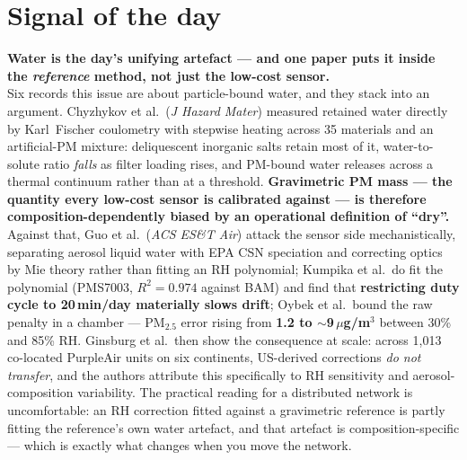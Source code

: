 \documentclass[10pt]{article}
\begin{document}
\vspace{6mm}

\section*{\sffamily\bfseries\color{Deep}Signal of the day}
\vspace{-1.5mm}{\color{Amber}\rule{\linewidth}{1.1pt}}\vspace{2.5mm}

\begin{keybox}
{\sffamily\bfseries\small\color{Deep}Water is the day's unifying artefact --- and one paper
puts it inside the \emph{reference} method, not just the low-cost sensor.}\\[1.4mm]
\footnotesize
Six records this issue are about particle-bound water, and they stack into an argument.
Chyzhykov et al.\ (\textit{J Hazard Mater}) measured retained water directly by
Karl~Fischer coulometry with stepwise heating across 35 materials and an artificial-PM
mixture: deliquescent inorganic salts retain most of it, water-to-solute ratio
\emph{falls} as filter loading rises, and PM-bound water releases across a thermal
continuum rather than at a threshold. \textbf{Gravimetric PM mass --- the quantity every
low-cost sensor is calibrated against --- is therefore composition-dependently biased by
an operational definition of ``dry''.} Against that, Guo et al.\ (\textit{ACS ES\&T Air})
attack the sensor side mechanistically, separating aerosol liquid water with EPA CSN
speciation and correcting optics by Mie theory rather than fitting an RH polynomial;
Kumpika et al.\ do fit the polynomial (PMS7003, $R^2 = 0.974$ against BAM) and find that
\textbf{restricting duty cycle to 20\,min/day materially slows drift}; Oybek et al.\
bound the raw penalty in a chamber --- PM$_{2.5}$ error rising from
\textbf{1.2 to $\sim$9\,$\mu$g/m$^3$} between 30\% and 85\% RH. Ginsburg et al.\ then show
the consequence at scale: across 1{,}013 co-located PurpleAir units on six continents,
US-derived corrections \emph{do not transfer}, and the authors attribute this specifically
to RH sensitivity and aerosol-composition variability. The practical reading for a
distributed network is uncomfortable: an RH correction fitted against a gravimetric
reference is partly fitting the reference's own water artefact, and that artefact is
composition-specific --- which is exactly what changes when you move the network.
\end{keybox}
\end{document}
